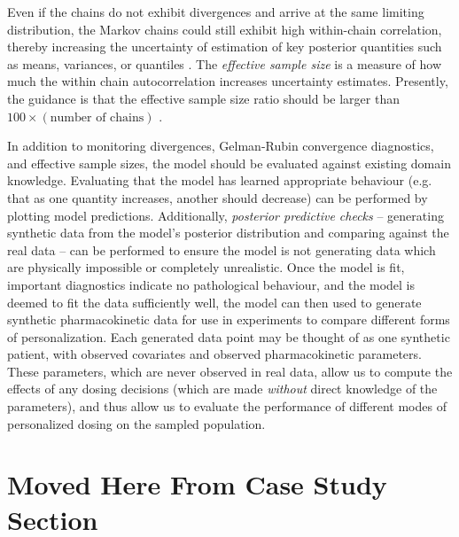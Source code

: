 Even if the chains do not exhibit divergences and arrive at the same limiting distribution, the Markov chains could still exhibit high within-chain correlation, thereby increasing the uncertainty of estimation of key posterior quantities such as means, variances, or quantiles \cite{brooks2011handbook}.  The \textit{effective sample size} is a measure of how much the within chain autocorrelation increases uncertainty estimates.  Presently, the guidance is that the effective sample size ratio should be larger than $100 \times (\mbox{number of chains})$ \cite{vehtari2019rank}.

In addition to monitoring divergences, Gelman-Rubin convergence diagnostics, and effective sample sizes, the model should be evaluated against existing domain knowledge.  Evaluating that the model has learned appropriate  behaviour (e.g. that as one quantity increases, another should decrease) can be performed by plotting model predictions.  Additionally, \textit{posterior predictive checks} -- generating synthetic data  from the model's posterior distribution and comparing against the real data -- can be performed to ensure the model is not generating data which are physically impossible or completely unrealistic. Once the model is fit, important diagnostics indicate no pathological behaviour, and the model is deemed to fit the data sufficiently well, the model can then used to generate synthetic pharmacokinetic data for use in experiments to compare different forms of personalization. Each generated data point may be thought of as one synthetic patient, with observed covariates and observed pharmacokinetic parameters. These parameters, which are never observed in real data, allow us to compute the effects of any dosing decisions (which are made \textit{without} direct knowledge of the parameters), and thus allow us to evaluate the performance of different modes of personalized dosing on the sampled population. 

\section{Moved Here From Case Study Section}

